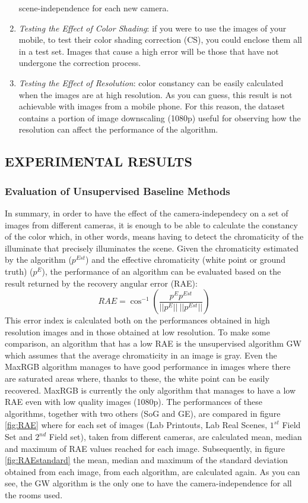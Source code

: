 \begin{enumerate}
    scene-independence for each new camera.
    \item \emph{Testing the Effect of Color Shading}: if you were to use the images 
    of your mobile, to test their color shading correction (CS), you could 
    enclose them all in a test set. Images that cause a high error will be 
    those that have not undergone the correction process.
    \item \emph{Testing the Effect of Resolution}: color constancy can be easily calculated 
    when the images are at high resolution. As you can guess, this 
    result is not achievable with images from a mobile phone. For this 
    reason, the dataset contains a portion of image downscaling (1080p) 
    useful for observing how the resolution can affect the performance of 
    the algorithm.
\end{enumerate}

\subsection{EXPERIMENTAL RESULTS}
\subsubsection{Evaluation of Unsupervised Baseline Methods}
In summary, in order to have the effect of the camera-independecy on a 
set of images from different cameras, it is enough to be able to calculate 
the constancy of the color which, in other words, means having to detect the 
chromaticity of the illuminate that precisely illuminates the scene. Given the 
chromaticity estimated by the algorithm ($ p^{Est} $) and the effective chromaticity 
(white point or ground truth) ($ p^E $), the performance of an algorithm can be 
evaluated based on the result returned by the recovery angular error (RAE):
\begin{equation}
    RAE=\cos^{-1}\left(\frac{p^Ep^{Est}}{||p^E||~||p^{Est}||}\right)
\end{equation}
This error index is calculated both on the performances obtained in high 
resolution images and in those obtained at low resolution. To make some 
comparison, an algorithm that has a low RAE is the unsupervised algorithm 
GW \cite{0807099104} which assumes that the average chromaticity in an image is gray. 
Even the MaxRGB algorithm \cite{0807099103} manages to have good performance 
in images where there are saturated areas where, thanks to these, the white 
point can be easily recovered. MaxRGB is currently the only algorithm that 
manages to have a low RAE even with low quality images (1080p). The 
performances of these algorithms, together with two others (SoG and GE), 
are compared in figure \ref{fig:RAE} where for each set of images (Lab 
Printouts, Lab Real Scenes, $ 1^{st} $ Field Set and $ 2^{nd} $ Field set), taken from different cameras, 
are calculated mean, median and maximum of RAE values reached for each 
image. Subsequently, in figure \ref{fig:RAEstandard} the mean, median and maximum of the 
standard deviation obtained from each image, from each algorithm, are calculated 
again. As you can see, the GW algorithm is the only one to have the 
camera-independence for all the rooms used.

